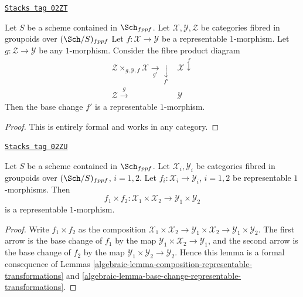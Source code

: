 \begin{lemma}
\label{algebraic-lemma-base-change-representable-transformations}
\href{https://stacks.math.columbia.edu/tag/02ZT}{\texttt{Stacks tag 02ZT}}

Let $S$ be a scheme contained in $\Sch_{fppf}$.
Let $\mathcal{X}, \mathcal{Y}, \mathcal{Z}$
be categories fibred in groupoids over $(\Sch/S)_{fppf}$
Let $f : \mathcal{X} \to \mathcal{Y}$ be a representable $1$-morphism.
Let $g : \mathcal{Z} \to \mathcal{Y}$ be any $1$-morphism.
Consider the fibre product diagram
$$
\begin{array}{cc}\mathcal{Z} \times_{g, \mathcal{Y}, f} \mathcal{X} \underset{g'}{\longrightarrow}\underset{f'}{\downarrow} & \mathcal{X} \overset{f}{\downarrow} \\ \mathcal{Z} \overset{g}{\longrightarrow} & \mathcal{Y}\end{array}
$$
Then the base change $f'$ is a representable $1$-morphism.
\end{lemma}

\begin{proof}
This is entirely formal and works in any category.
\end{proof}

\begin{lemma}
\label{algebraic-lemma-product-representable-transformations}
\href{https://stacks.math.columbia.edu/tag/02ZU}{\texttt{Stacks tag 02ZU}}

Let $S$ be a scheme contained in $\Sch_{fppf}$.
Let $\mathcal{X}_i, \mathcal{Y}_i$ be categories fibred in groupoids over
$(\Sch/S)_{fppf}$, $i = 1, 2$.
Let $f_i : \mathcal{X}_i \to \mathcal{Y}_i$, $i = 1, 2$
be representable $1$-morphisms.
Then
$$
f_1 \times f_2 :
\mathcal{X}_1 \times \mathcal{X}_2
\longrightarrow
\mathcal{Y}_1 \times \mathcal{Y}_2
$$
is a representable $1$-morphism.
\end{lemma}

\begin{proof}

Write $f_1 \times f_2$ as the composition
$\mathcal{X}_1 \times \mathcal{X}_2 \to
\mathcal{Y}_1 \times \mathcal{X}_2 \to
\mathcal{Y}_1 \times \mathcal{Y}_2$.
The first arrow is the base change of $f_1$ by the map
$\mathcal{Y}_1 \times \mathcal{X}_2 \to \mathcal{Y}_1$, and the second arrow
is the base change of $f_2$ by the map
$\mathcal{Y}_1 \times \mathcal{Y}_2 \to \mathcal{Y}_2$.
Hence this lemma is a formal
consequence of Lemmas \ref{algebraic-lemma-composition-representable-transformations}
and \ref{algebraic-lemma-base-change-representable-transformations}.
\end{proof}

